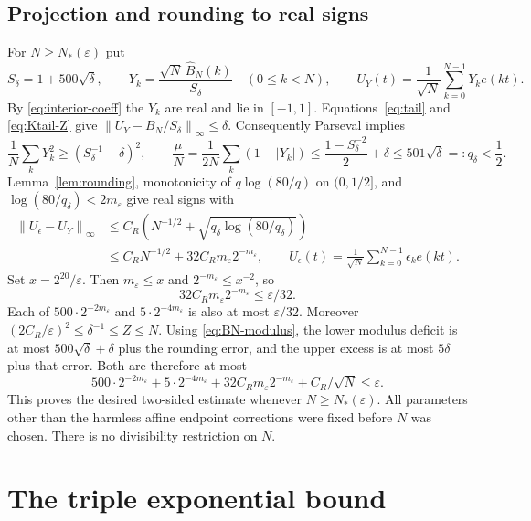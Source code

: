\documentclass[11pt]{article}
\theoremstyle{remark}
\newcommand{\norm}[1]{\left\|#1\right\|}
\begin{document}
\subsection{Projection and rounding to real signs}

For $N\ge N_*(\varepsilon)$ put
\[
 S_\delta=1+500\sqrt\delta,\qquad
 Y_k=\frac{\sqrt N\,\widehat B_N(k)}{S_\delta}\quad(0\le k<N),
 \qquad U_Y(t)=\frac1{\sqrt N}\sum_{k=0}^{N-1}Y_ke(kt).
\]
By \eqref{eq:interior-coeff} the $Y_k$ are real and lie in $[-1,1]$.
Equations~\eqref{eq:tail} and \eqref{eq:Ktail-Z} give
$\norm{U_Y-B_N/S_\delta}_\infty\le\delta$.
Consequently Parseval implies
\[
 \frac1N\sum_kY_k^2\ge(S_\delta^{-1}-\delta)^2,
 \qquad
 \frac\mu N=\frac1{2N}\sum_k(1-|Y_k|)
 \le\frac{1-S_\delta^{-2}}2+\delta
 \le501\sqrt\delta=:q_\delta<\frac12.
\]
Lemma~\ref{lem:rounding}, monotonicity of $q\log(80/q)$ on $(0,1/2]$,
and $\log(80/q_\delta)<2m_\varepsilon$ give real signs with
\begin{align*}
 \norm{U_\epsilon-U_Y}_\infty
 &\le C_R\left(N^{-1/2}+\sqrt{q_\delta\log(80/q_\delta)}\right)\\
 &\le C_RN^{-1/2}+32C_Rm_\varepsilon2^{-m_\varepsilon},
 \qquad U_\epsilon(t)=\frac1{\sqrt N}\sum_{k=0}^{N-1}\epsilon_ke(kt).
\end{align*}
Set $x=2^{20}/\varepsilon$. Then $m_\varepsilon\le x$ and
$2^{-m_\varepsilon}\le x^{-2}$, so
\[
 32C_Rm_\varepsilon2^{-m_\varepsilon}\le\varepsilon/32.
\]
Each of $500\cdot2^{-2m_\varepsilon}$ and
$5\cdot2^{-4m_\varepsilon}$ is also at most $\varepsilon/32$.
Moreover $(2C_R/\varepsilon)^2\le\delta^{-1}\le Z\le N$.
Using \eqref{eq:BN-modulus}, the lower modulus deficit is at most
$500\sqrt\delta+\delta$ plus the rounding error, and the upper excess
is at most $5\delta$ plus that error. Both are therefore at most
\[
 500\cdot2^{-2m_\varepsilon}+5\cdot2^{-4m_\varepsilon}
 +32C_Rm_\varepsilon2^{-m_\varepsilon}+C_R/\sqrt N
 \le\varepsilon.
\]
This proves the desired two-sided estimate whenever $N\ge N_*(\varepsilon)$.
All parameters other than the harmless affine endpoint corrections were
fixed before $N$ was chosen. There is no divisibility restriction on $N$.

\section{The triple exponential bound}\label{sec:tower}
\end{document}
